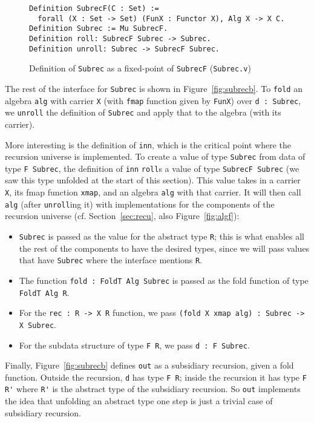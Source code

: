 \documentclass[a4paper,USenglish]{lipics-v2021}
\begin{document}
\begin{figure}
\begin{verbatim}
Definition SubrecF(C : Set) :=
  forall (X : Set -> Set) (FunX : Functor X), Alg X -> X C.
Definition Subrec := Mu SubrecF.
Definition roll: SubrecF Subrec -> Subrec.
Definition unroll: Subrec -> SubrecF Subrec.
\end{verbatim}
\caption{Definition of \texttt{Subrec} as a fixed-point of \texttt{SubrecF} (\texttt{Subrec.v})}
\label{fig:subrec}
\end{figure}

The rest of the interface for \verb|Subrec| is shown in
Figure~\ref{fig:subrecb}.  To \verb|fold| an algebra
\verb|alg| with carrier \verb|X| (with \verb|fmap| function given by
\verb|FunX|) over \verb|d : Subrec|, we \verb|unroll| the
definition of \verb|Subrec| and apply that to the algebra (with its
carrier).

More interesting is the definition of \verb|inn|, which is the
critical point where the recursion universe is implemented.  To create
a value of type \verb|Subrec| from data of type \verb|F Subrec|, the
definition of \verb|inn| \verb|roll|s a value of type
\verb|SubrecF Subrec| (we saw this type unfolded at the start of
this section).  This value takes in a carrier
\verb|X|, its fmap function \verb|xmap|, and an algebra \verb|alg|
with that carrier.  It will then call \verb|alg| (after \verb|unroll|ing
it) with implementations for the components of the recursion universe
(cf. Section~\ref{sec:recu}, also Figure~\ref{fig:algf}):
\begin{itemize}
\item \verb|Subrec| is passed as the value for the abstract type \verb|R|; this is what enables all
  the rest of the components to have the desired types, since we will pass values that have \verb|Subrec|
  where the interface mentions \verb|R|.
\item The function \verb|fold : FoldT Alg Subrec| is passed as
  the fold function of type \verb|FoldT Alg R|.
\item For the \verb|rec : R -> X R| function, we pass \verb|(fold X xmap alg) : Subrec -> X Subrec|.
\item For the subdata structure of type \verb|F R|, we pass \verb|d : F Subrec|.
\end{itemize}

Finally, Figure~\ref{fig:subrecb} defines \verb|out| as a subsidiary
recursion, given a fold function.
Outside the recursion, \verb|d| has type \verb|F R|; inside the
recursion it has type \verb|F R'| where \verb|R'| is the abstract type
of the subsidiary recursion.  So \verb|out| implements the idea that
unfolding an abstract type one step is just a trivial case of
subsidiary recursion.
\end{document}
